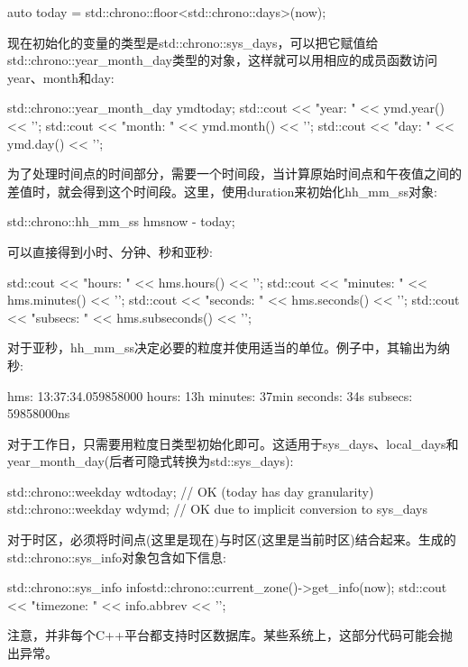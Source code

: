 \begin{cpp}
auto today = std::chrono::floor<std::chrono::days>(now);
\end{cpp}

现在初始化的变量的类型是std::chrono::sys\_days，可以把它赋值给std::chrono::year\_month\_day类型的对象，这样就可以用相应的成员函数访问year、month和day:

\begin{cpp}
std::chrono::year_month_day ymd{today};
std::cout << "year: " << ymd.year() << '\n';
std::cout << "month: " << ymd.month() << '\n';
std::cout << "day: " << ymd.day() << '\n';
\end{cpp}

为了处理时间点的时间部分，需要一个时间段，当计算原始时间点和午夜值之间的差值时，就会得到这个时间段。这里，使用duration来初始化hh\_mm\_ss对象:

\begin{cpp}
std::chrono::hh_mm_ss hms{now - today};
\end{cpp}

可以直接得到小时、分钟、秒和亚秒:

\begin{cpp}
std::cout << "hours: " << hms.hours() << '\n';
std::cout << "minutes: " << hms.minutes() << '\n';
std::cout << "seconds: " << hms.seconds() << '\n';
std::cout << "subsecs: " << hms.subseconds() << '\n';
\end{cpp}

对于亚秒，hh\_mm\_ss决定必要的粒度并使用适当的单位。例子中，其输出为纳秒:

\begin{shell}
hms:      13:37:34.059858000
hours:    13h
minutes:  37min
seconds:  34s
subsecs:  59858000ns
\end{shell}

对于工作日，只需要用粒度日类型初始化即可。这适用于sys\_days、local\_days和year\_month\_day(后者可隐式转换为std::sys\_days):

\begin{cpp}
std::chrono::weekday wd{today}; // OK (today has day granularity)
std::chrono::weekday wd{ymd}; // OK due to implicit conversion to sys_days
\end{cpp}

对于时区，必须将时间点(这里是现在)与时区(这里是当前时区)结合起来。生成的std::chrono::sys\_info对象包含如下信息:

\begin{cpp}
std::chrono::sys_info info{std::chrono::current_zone()->get_info(now)};
std::cout << "timezone: " << info.abbrev << '\n';
\end{cpp}

注意，并非每个C++平台都支持时区数据库。某些系统上，这部分代码可能会抛出异常。




















